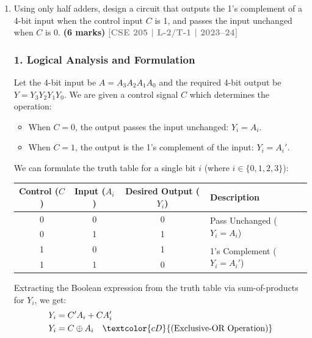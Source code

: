 \documentclass[12pt,a3paper]{article}
\newcommand{\yr}[1]{\hfill\textcolor{gray}{\small\textbf{[#1]}}}
\newcommand{\mk}[1]{\textcolor{orange!70!black}{\small\textbf{(#1 marks)}}}
\begin{document}
\begin{enumerate}


\item Using only half adders, design a circuit that outputs the 1's complement of a 4-bit input when the control input $C$ is 1, and passes the input unchanged when $C$ is 0.
\mk{6} \yr{CSE 205 | L-2/T-1 | 2023--24}

\begin{tcolorbox}[enhanced,breakable,ansbox,colback=cD!4,colframe=cD,boxrule=0.8pt,arc=5pt,title={\textbf{Answer}},fonttitle=\bfseries\color{white},colbacktitle=cD]

\subsubsection*{1. Logical Analysis and Formulation}
Let the 4-bit input be $A = A_3 A_2 A_1 A_0$ and the required 4-bit output be $Y = Y_3 Y_2 Y_1 Y_0$. We are given a control signal $C$ which determines the operation:
\begin{itemize}
    \item When $C = 0$, the output passes the input unchanged: $Y_i = A_i$.
    \item When $C = 1$, the output is the 1's complement of the input: $Y_i = A_i'$.
\end{itemize}

We can formulate the truth table for a single bit $i$ (where $i \in \{0,1,2,3\}$):

\begin{center}
\renewcommand{\arraystretch}{1.2}
\begin{tabular}{cc|c|l}
\toprule
\textbf{Control ($C$)} & \textbf{Input ($A_i$)} & \textbf{Desired Output ($Y_i$)} & \textbf{Description} \\
\midrule
0 & 0 & 0 & \multirow{2}{*}{Pass Unchanged ($Y_i = A_i$)} \\
0 & 1 & 1 & \\
\midrule
1 & 0 & 1 & \multirow{2}{*}{1's Complement ($Y_i = A_i'$)} \\
1 & 1 & 0 & \\
\bottomrule
\end{tabular}
\end{center}

Extracting the Boolean expression from the truth table via sum-of-products for $Y_i$, we get:
\begin{align*}
    Y_i &= C'A_i + CA_i' \\
    Y_i &= C \oplus A_i \quad \textcolor{cD}{\text{(Exclusive-OR Operation)}}
\end{align*}


\end{tcolorbox}
\end{enumerate}
\end{document}
